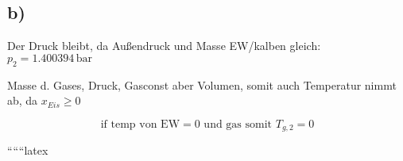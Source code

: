 

\subsection*{b)}

Der Druck bleibt, da Außendruck und Masse EW/kalben gleich: \( p_2 = 1.400394 \, \text{bar} \)

Masse d. Gases, Druck, Gasconst aber Volumen, somit auch Temperatur nimmt ab, da \( x_{Eis} \geq 0 \)

\[
\text{if temp von EW} = 0 \text{ und gas somit } T_{g,2} = 0
\]

``````latex